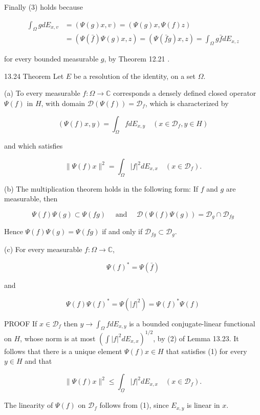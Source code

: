 \documentclass[10pt]{article}
\begin{document}
Finally (3) holds because

$$
\begin{aligned}
\int_{\Omega} g d E_{x, v} & =(\Psi(g) x, v)=(\Psi(g) x, \Psi(f) z) \\
& =(\Psi(\bar{f}) \Psi(g) x, z)=(\Psi(\bar{f} g) x, z)=\int_{\Omega} g \bar{f} d E_{x, z}
\end{aligned}
$$

for every bounded measurable $g$, by Theorem 12.21 .

13.24 Theorem Let $E$ be a resolution of the identity, on a set $\Omega$.

(a) To every measurable $f: \Omega \rightarrow \mathbb{C}$ corresponds a densely defined closed operator $\Psi(f)$ in $H$, with domain $\mathscr{D}(\Psi(f))=\mathscr{D}_{f}$, which is characterized by

$$
(\Psi(f) x, y)=\int_{\Omega} f d E_{x, y} \quad\left(x \in \mathscr{D}_{f}, y \in H\right)
$$

and which satisfies

$$
\|\Psi(f) x\|^{2}=\int_{\Omega}|f|^{2} d E_{x, x} \quad\left(x \in \mathscr{D}_{f}\right) .
$$

(b) The multiplication theorem holds in the following form: If $f$ and $g$ are measurable, then

$$
\Psi(f) \Psi(g) \subset \Psi(f g) \quad \text { and } \quad \mathscr{D}(\Psi(f) \Psi(g))=\mathscr{D}_{g} \cap \mathscr{D}_{f g}
$$

Hence $\Psi(f) \Psi(g)=\Psi(f g)$ if and only if $\mathscr{D}_{f g} \subset \mathscr{D}_{g}$.

(c) For every measurable $f: \Omega \rightarrow \mathbb{C}$,

$$
\Psi(f)^{*}=\Psi(\bar{f})
$$

and

$$
\Psi(f) \Psi(f)^{*}=\Psi\left(|f|^{2}\right)=\Psi(f)^{*} \Psi(f)
$$

PROOF If $x \in \mathscr{D}_{f}$ then $y \rightarrow \int_{\Omega} f d E_{x, y}$ is a bounded conjugate-linear functional on $H$, whose norm is at most $\left(\int|f|^{2} d E_{x, x}\right)^{1 / 2}$, by (2) of Lemma 13.23. It follows that there is a unique element $\Psi(f) x \in H$ that satisfies (1) for every $y \in H$ and that

$$
\|\Psi(f) x\|^{2} \leq \int_{\underline{\Omega}}|f|^{2} d E_{x, x} \quad\left(x \in \mathscr{D}_{f}\right) .
$$

The linearity of $\Psi(f)$ on $\mathscr{D}_{f}$ follows from (1), since $E_{x, y}$ is linear in $x$.
\end{document}
